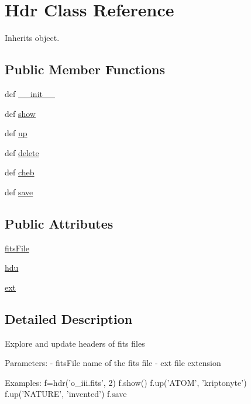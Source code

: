 \hypertarget{classpyneb_1_1utils_1_1fits_1_1_hdr}{\section{Hdr Class Reference}
\label{classpyneb_1_1utils_1_1fits_1_1_hdr}
}


Inherits object.

\subsection*{Public Member Functions}
\begin{DoxyCompactItemize}
\item 
def \hyperlink{classpyneb_1_1utils_1_1fits_1_1_hdr_ac775ee34451fdfa742b318538164070e}{\-\_\-\-\_\-init\-\_\-\-\_\-}
\item 
def \hyperlink{classpyneb_1_1utils_1_1fits_1_1_hdr_a051649d4f6e0c3c1e1e47d8699feb801}{show}
\item 
def \hyperlink{classpyneb_1_1utils_1_1fits_1_1_hdr_aca6a1cb8c41e6c6f7af98e8aead37404}{up}
\item 
def \hyperlink{classpyneb_1_1utils_1_1fits_1_1_hdr_ab48bde70a0927a83d62464cb0627c34b}{delete}
\item 
def \hyperlink{classpyneb_1_1utils_1_1fits_1_1_hdr_a5d9a2ab74646e9f412ef536ac69af82c}{cheb}
\item 
def \hyperlink{classpyneb_1_1utils_1_1fits_1_1_hdr_aba0970ece8740693d3b82e656500a9c0}{save}
\end{DoxyCompactItemize}
\subsection*{Public Attributes}
\begin{DoxyCompactItemize}
\item 
\hyperlink{classpyneb_1_1utils_1_1fits_1_1_hdr_ad092fe9d48062772503ecf85d5881066}{fits\-File}
\item 
\hyperlink{classpyneb_1_1utils_1_1fits_1_1_hdr_acab07a969db3493dffcc4db737d4fb74}{hdu}
\item 
\hyperlink{classpyneb_1_1utils_1_1fits_1_1_hdr_a6215e022267dc11d572ec677098947ab}{ext}
\end{DoxyCompactItemize}


\subsection{Detailed Description}
\begin{DoxyVerb}Explore and update headers of fits files

Parameters:
    - fitsFile  name of the fits file
    - ext       file extension

Examples:
    f=hdr('o_iii.fits', 2)
    f.show()
    f.up('ATOM', 'kriptonyte')
    f.up('NATURE', 'invented')
    f.save\end{DoxyVerb}
 

